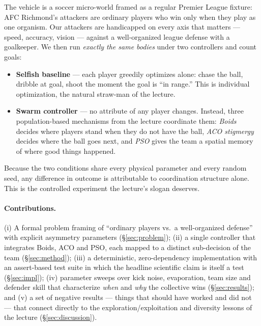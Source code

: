 \documentclass[11pt,a4paper]{article}
\begin{document}
The vehicle is a soccer micro-world framed as a regular Premier League fixture: AFC Richmond's
attackers are ordinary players who win only when they play as one organism. Our attackers are
handicapped on every axis that matters --- speed, accuracy, vision --- against a well-organized
league defense with a goalkeeper. We then run \emph{exactly the same bodies} under two
controllers and count goals:

\begin{itemize}[itemsep=2pt]
  \item \textbf{Selfish baseline} --- each player greedily optimizes alone: chase the ball,
        dribble at goal, shoot the moment the goal is ``in range.'' This is individual
        optimization, the natural straw-man of the lecture.
  \item \textbf{Swarm controller} --- no attribute of any player changes. Instead, three
        population-based mechanisms from the lecture coordinate them: \emph{Boids} decides where
        players stand when they do not have the ball, \emph{ACO stigmergy} decides where the ball
        goes next, and \emph{PSO} gives the team a spatial memory of where good things happened.
\end{itemize}

Because the two conditions share every physical parameter and every random seed, any difference
in outcome is attributable to coordination structure alone. This is the controlled experiment the
lecture's slogan deserves.

\paragraph{Contributions.} (i) A formal problem framing of ``ordinary players vs.\ a well-organized
defense'' with explicit asymmetry parameters (\S\ref{sec:problem}); (ii) a single controller that
integrates Boids, ACO and PSO, each mapped to a distinct sub-decision of the team
(\S\ref{sec:method}); (iii) a deterministic, zero-dependency implementation with an assert-based
test suite in which the headline scientific claim is itself a test (\S\ref{sec:impl});
(iv) parameter sweeps over kick noise, evaporation, team size and defender skill that
characterize \emph{when} and \emph{why} the collective wins (\S\ref{sec:results}); and (v) a set
of negative results --- things that should have worked and did not --- that connect directly to
the exploration/exploitation and diversity lessons of the lecture (\S\ref{sec:discussion}).
\end{document}
